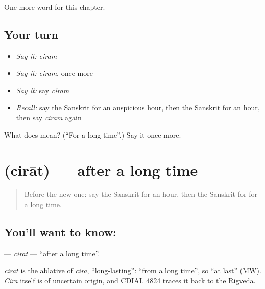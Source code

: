 \begin{grammarlens}[title={What you've built}]
One more word for this chapter.
\end{grammarlens}

\subsection*{Your turn}
\begin{itemize}
\raggedright
  \item \emph{Say it:} \emph{ciram}
  \item \emph{Say it:} \emph{ciram}, once more
  \item \emph{Say it:} say \emph{ciram}
  \item \emph{Recall:} say the Sanskrit for an auspicious hour, then the Sanskrit for an hour, then say \emph{ciram} again
\end{itemize}

\begin{tcolorbox}[breakable,colback=teal!4,colframe=teal!35!black,title={Before you move on}]
What does  mean? (\textquotedblleft{}For a long time\textquotedblright{}.) Say it once more.
\end{tcolorbox}
\section[\texorpdfstring{\sk{चिरात्} (cirāt)}{चिरात् (cirāt)}]{ (cirāt) — after a long time}

\label{lesson:SA-C183-cirat}



\begin{quote}
Before the new one: say the Sanskrit for an hour, then the Sanskrit for for a long time.
\end{quote}

\subsection*{You'll want to know: }
\textbf{} — \emph{cirāt} — \textquotedblleft{}after a long time\textquotedblright{}.

\begin{cousinweb}
\emph{cirāt} is the ablative of \emph{cira}, \textquotedblleft{}long-lasting\textquotedblright{}: \textquotedblleft{}from a long time\textquotedblright{}, so \textquotedblleft{}at last\textquotedblright{} (MW). \emph{Cira} itself is of uncertain origin, and CDIAL 4824 traces it back to the Rigveda.
\end{cousinweb}

